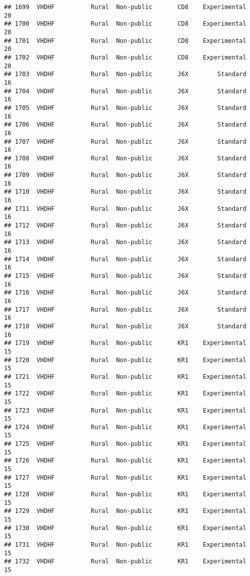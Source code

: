 \documentclass[
]{article}
\begin{document}
\begin{verbatim}
## 1699  VHDHF          Rural  Non-public       CD8    Experimental        20
## 1700  VHDHF          Rural  Non-public       CD8    Experimental        20
## 1701  VHDHF          Rural  Non-public       CD8    Experimental        20
## 1702  VHDHF          Rural  Non-public       CD8    Experimental        20
## 1703  VHDHF          Rural  Non-public       J6X        Standard        16
## 1704  VHDHF          Rural  Non-public       J6X        Standard        16
## 1705  VHDHF          Rural  Non-public       J6X        Standard        16
## 1706  VHDHF          Rural  Non-public       J6X        Standard        16
## 1707  VHDHF          Rural  Non-public       J6X        Standard        16
## 1708  VHDHF          Rural  Non-public       J6X        Standard        16
## 1709  VHDHF          Rural  Non-public       J6X        Standard        16
## 1710  VHDHF          Rural  Non-public       J6X        Standard        16
## 1711  VHDHF          Rural  Non-public       J6X        Standard        16
## 1712  VHDHF          Rural  Non-public       J6X        Standard        16
## 1713  VHDHF          Rural  Non-public       J6X        Standard        16
## 1714  VHDHF          Rural  Non-public       J6X        Standard        16
## 1715  VHDHF          Rural  Non-public       J6X        Standard        16
## 1716  VHDHF          Rural  Non-public       J6X        Standard        16
## 1717  VHDHF          Rural  Non-public       J6X        Standard        16
## 1718  VHDHF          Rural  Non-public       J6X        Standard        16
## 1719  VHDHF          Rural  Non-public       KR1    Experimental        15
## 1720  VHDHF          Rural  Non-public       KR1    Experimental        15
## 1721  VHDHF          Rural  Non-public       KR1    Experimental        15
## 1722  VHDHF          Rural  Non-public       KR1    Experimental        15
## 1723  VHDHF          Rural  Non-public       KR1    Experimental        15
## 1724  VHDHF          Rural  Non-public       KR1    Experimental        15
## 1725  VHDHF          Rural  Non-public       KR1    Experimental        15
## 1726  VHDHF          Rural  Non-public       KR1    Experimental        15
## 1727  VHDHF          Rural  Non-public       KR1    Experimental        15
## 1728  VHDHF          Rural  Non-public       KR1    Experimental        15
## 1729  VHDHF          Rural  Non-public       KR1    Experimental        15
## 1730  VHDHF          Rural  Non-public       KR1    Experimental        15
## 1731  VHDHF          Rural  Non-public       KR1    Experimental        15
## 1732  VHDHF          Rural  Non-public       KR1    Experimental        15

\end{verbatim}
\end{document}
